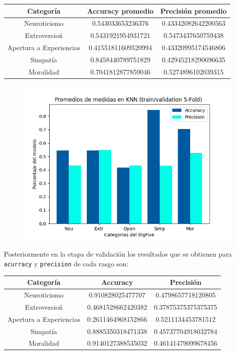 \documentclass[10pt, a4paper]{article}
\begin{document}
                \begin{tabular}[h!]{|c|c|c|}

                    \hline Categor\'ia & Accuracy promedio & Precisi\'on promedio \\  
                    \hline Neuroticismo & 0.543033653236376 & 0.43342082642200563 \\
                    \hline Extroversio\'n& 0.5431921954931721 & 0.5473437650759438 \\
                    \hline Apertura a Experiencias & 0.41551811609520994 & 0.43320995174546806 \\
                    \hline Simpat\'ia& 0.8458440789751829 & 0.42945218290696635 \\
                    \hline Moralidad & 0.7041812877859046 & 0.5274896102039315 \\
                    \hline
                \end{tabular}

                \begin{figure}[h!]
                    \centering
                    \includegraphics[width = 0.7\linewidth]{bar_knn.png}
                \end{figure}

                Posteriormente en la etapa de validaci\'on los resultados que se obtienen para \texttt{acurracy} y \texttt{precision} de cada rasgo son: 

                \begin{tabular}[h!]{|c|c|c|}

                    \hline Categor\'ia & Accuracy & Precisi\'on \\  
                    \hline Neuroticismo             & 0.910828025477707  & 0.4798657718120805 \\
                    \hline Extroversio\'n           & 0.4681528662420382 & 0.37875375375375375 \\
                    \hline Apertura a Experiencias  & 0.2611464968152866 & 0.5211134453781512 \\
                    \hline Simpat\'ia               & 0.8885350318471338 & 0.45737704918032784 \\
                    \hline Moralidad                & 0.9140127388535032 & 0.46141479099678456 \\
                    \hline
                \end{tabular}
            
\end{document}
